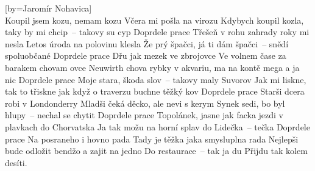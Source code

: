 [by={Jaromír Nohavica}]
\emptyv
\cseq{\[Dm] \[G] \[B] \[A] \[Dm] \[A]}\\
\cl
\chordsoff
\freev
Koupil jsem kozu, nemam kozu
Včera mi pošla na virozu
Kdybych koupil kozla, taky by mi chcip~-- takovy su cyp
Doprdele prace
\cl
\freev
Třešeň v rohu zahrady roky mi nesla
Letos úroda na polovinu klesla
Že prý špačci, já ti dám špačci~-- snědí spoluobčané
Doprdele prace
\cl
\freev
Dřu jak mezek ve zbrojovce
Ve volnem čase za barakem chovam ovce
Neuwirth chova rybky v akvariu, ma na kontě mega a ja nic
Doprdele prace
\cl
\freev
Moje stara, škoda slov~-- takovy maly Suvorov
Jak mi liskne, tak to třiskne
jak když o traverzu buchne těžký kov
Doprdele prace
\cl
\freev
Starši dcera robi v Londonderry
Mladši čeká děcko, ale nevi s kerym
Synek sedi, bo byl hlupy~-- nechal se chytit
Doprdele prace
\cl
\freev
Topolánek, jasne jak facka
jezdi v plavkach do Chorvatska
Ja tak možu na horní splav do Lidečka~-- tečka
Doprdele prace
\cl
\freev
Na posraneho i hovno pada
Tady je těžka jaka smysluplna rada
Nejlepši bude odložit bendžo a zajit na jedno
Do restaurace~-- tak ja du
\cl
\recite
Přijdu tak kolem desíti.
\cl
\endsong




